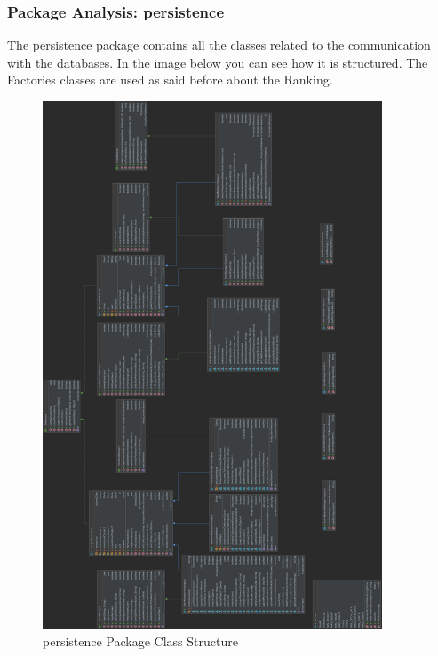 \subsubsection{Package Analysis: persistence}
The persistence package contains all the classes related to the communication with the databases. In the image below you can see how it is structured. The Factories classes are used as said before about the Ranking. 
\begin{figure}[H]
	\centering
	\includegraphics[width=0.9\textwidth]{img/persistence_package.png}
	\caption{persistence Package Class Structure}
\end{figure}

